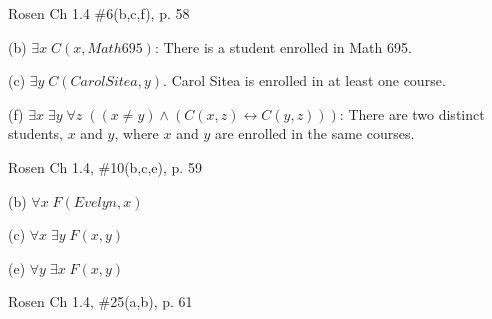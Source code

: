 \documentclass[12pt]{exam}
\newenvironment{my_parts}{
\begin{parts}
    \setlength{\itemsep}{1pt}
    \setlength{\parskip}{0pt}
    \setlength{\parsep}{0pt}
}{\end{parts}}
\newenvironment{my_item}{
\begin{itemize}
    \setlength{\itemsep}{1pt}
    \setlength{\parskip}{0pt}
    \setlength{\parsep}{0pt}
}{\end{itemize}}
\begin{document}
\begin{questions}
\question Rosen Ch 1.4 \#6(b,c,f), p. 58
    \begin{solution}
    \begin{my_item}
        \item[(b)] $\exists x\; C(x, Math 695)$: There is a student enrolled in Math 695.
        \item[(c)] $\exists y\; C(Carol Sitea, y)$. Carol Sitea is enrolled in at least one course.
        \item[(f)] $\exists x\; \exists y\; \forall z\; ((x \neq y) \wedge (C(x,z) \leftrightarrow C(y,z)))$: There are two distinct students, $x$ and $y$,  where $x$ and $y$ are enrolled in the same courses.
    \end{my_item}
    \end{solution}

\question Rosen Ch 1.4, \#10(b,c,e), p. 59
    \begin{solution}
    \begin{my_item}
        \item[(b)] $\forall x\; F(Evelyn, x)$
        \item[(c)] $\forall x\; \exists y\; F(x,y)$
        \item[(e)] $\forall y\; \exists x\; F(x,y)$
    \end{my_item}
    \end{solution}

\question Rosen Ch 1.4, \#25(a,b), p. 61
    \begin{solution}
    \end{solution}



\end{questions}
\end{document}
